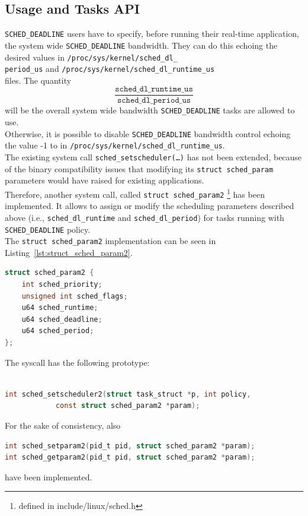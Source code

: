 \subsection{Usage and Tasks API}\label{sec:schedDead_API}
\texttt{SCHED\_DEADLINE} users have to specify, before running their real-time
application, the system wide \texttt{SCHED\_DEADLINE} bandwidth. They can do
this echoing the desired values in
\texttt{/proc/sys/kernel/sched\_dl\_}\\
\texttt{period\_us} and
\texttt{/proc/sys/kernel/sched\_dl\_runtime\_us}\\
files. The quantity
$$
\frac{\texttt{sched\_dl\_runtime\_us}}
{\texttt{sched\_dl\_period\_us}}
$$
will be the overall system wide bandwidth \texttt{SCHED\_DEADLINE} tasks are
allowed to use.\\
Otherwise, it is possible to disable \texttt{SCHED\_DEADLINE} bandwidth control echoing
the value -1 to in \texttt{/proc/sys/kernel/sched\_dl\_runtime\_us}.\\
The existing system call \texttt{sched\_setscheduler(\dots)} has not been
extended, because of the binary compatibility issues that modifying its
\texttt{struct sched\_param} parameters would have raised for existing
applications. \\
Therefore, another system call, called \texttt{struct sched\_param2}
\footnote{defined in include/linux/sched.h} has been implemented. 
It allows to assign or modify the scheduling parameters described above 
(i.e., \texttt{sched\_dl\_runtime} and \texttt{sched\_dl\_period})
for tasks running with \texttt{SCHED\_DEADLINE} policy. \\
The \texttt{struct sched\_param2} implementation can be seen in
Listing~\ref{lst:struct_sched_param2}.

\begin{lstlisting}[language=C, caption={\texttt{struct sched\_param2}},
                        label={lst:struct_sched_param2}]
struct sched_param2 {  
    int sched_priority;  
    unsigned int sched_flags;  
    u64 sched_runtime;  
    u64 sched_deadline;  
    u64 sched_period;  
};

\end{lstlisting}

The syscall has the following prototype:

\begin{lstlisting}[language=C, caption={\texttt{sched\_setscheduler2} syscall},
			label={lst:sched_setscheduler2}]

int sched_setscheduler2(struct task_struct *p, int policy,
			const struct sched_param2 *param);

\end{lstlisting}

For the sake of consistency, also 

\begin{lstlisting}[language=C, caption={\texttt{sched\_setparam2} and \texttt{sched\_getparam2} syscalls}]
int sched_setparam2(pid_t pid, struct sched_param2 *param);
int sched_getparam2(pid_t pid, struct sched_param2 *param);
\end{lstlisting}

have been implemented.
